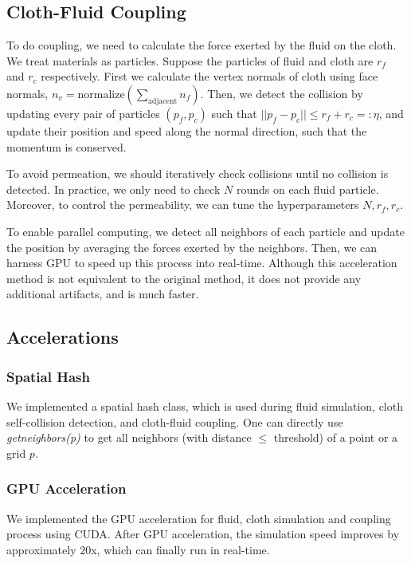 \subsection{Cloth-Fluid Coupling}

To do coupling, we need to calculate the force exerted by the fluid on the cloth. We treat materials as particles. Suppose the particles of fluid and cloth are $r_f$ and $r_c$ respectively. First we calculate the vertex normals of cloth using face normals, $n_v=\text{normalize}(\sum_{\text{adjacent}} n_f)$. Then, we detect the collision by updating every pair of particles $(p_f,p_c)$ such that $||p_f-p_c||\le r_f+r_c=:\eta$, and update their position and speed along the normal direction, such that the momentum is conserved.

To avoid permeation, we should iteratively check collisions until no collision is detected. In practice, we only need to check $N$ rounds on each fluid particle. Moreover, to control the permeability, we can tune the hyperparameters $N,r_f,r_c$.

To enable parallel computing, we detect all neighbors of each particle and update the position by averaging the forces exerted by the neighbors. Then, we can harness GPU to speed up this process into real-time. Although this acceleration method is not equivalent to the original method, it does not provide any additional artifacts, and is much faster.

\subsection{Accelerations}

\subsubsection{Spatial Hash} We implemented a spatial hash class, which is used during fluid simulation, cloth self-collision detection, and cloth-fluid coupling. One can directly use \textit{getneighbors(p)} to get all neighbors (with distance $\le $ threshold) of a point or a grid $p$.

\subsubsection{GPU Acceleration} We implemented the GPU acceleration for fluid, cloth simulation and coupling process using CUDA. After GPU acceleration, the simulation speed improves by approximately $20$x, which can finally run in real-time.

